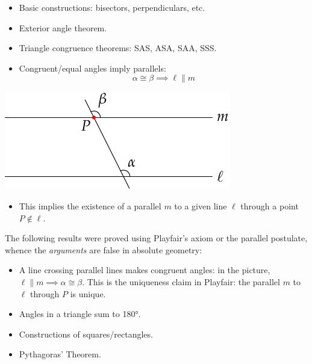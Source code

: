 \begin{minipage}[t]{0.6\linewidth}\vspace{-5pt}
	\begin{itemize}\itemsep2pt
	  \item Basic constructions: bisectors, perpendiculars, etc.
	  \item Exterior angle theorem.
	  \item Triangle congruence theorems: SAS, ASA, SAA, SSS.
	  \item Congruent/equal angles imply parallels:
	  \[
	  	\alpha\cong\beta\implies \ell\parallel m
	  \]
	\end{itemize}
\end{minipage}
\hfill
\begin{minipage}[t]{0.39\linewidth}\vspace{0pt}
	\flushright\includegraphics{history-playfair}
\end{minipage}

\begin{itemize}
  \item[]This implies the existence of a parallel $m$ to a given line $\ell$ through a point $P\not\in\ell$.
\end{itemize}


\label{pg:absolute}

The following results were proved using Playfair's axiom or the parallel postulate, whence the \emph{arguments} are false in absolute geometry:
\begin{itemize}\itemsep2pt
  \item A line crossing parallel lines makes congruent angles: in the picture,  $\ell\parallel m\implies \alpha\cong\beta$. This is the uniqueness claim in Playfair: the parallel $m$ to $\ell$ through $P$ is unique.
  \item Angles in a triangle sum to \ang{180}.
  \item Constructions of squares/rectangles.
  \item Pythagoras' Theorem.
\end{itemize}

